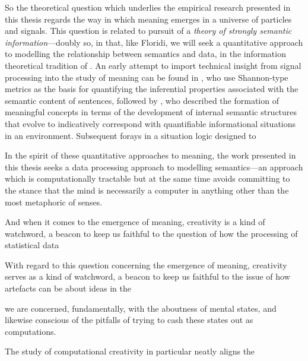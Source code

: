 

So the theoretical question which underlies the empirical research presented in this thesis regards the way in which meaning emerges in a universe of particles and signals.  This question is related to  pursuit of a \emph{theory of strongly semantic information}---doubly so, in that, like Floridi, we will seek a quantitative approach to modelling the relationship between semantics and data, in the information theoretical tradition of \cite{Shannon}.  An early attempt to import technical insight from signal processing into the study of meaning can be found in , who use Shannon-type metrics as the basis for quantifying the inferential properties associated with the semantic content of sentences, followed by \cite{Dretske}, who described the formation of meaningful concepts in terms of the development of internal semantic structures that evolve to indicatively correspond with quantifiable informational situations in an environment.  Subsequent forays in a situation logic designed to 

\cite{BarwiseEA}

In the spirit of these quantitative approaches to meaning, the work presented in this thesis seeks a data processing approach to modelling semantics---an approach which is computationally tractable but at the same time avoids committing to the stance that the mind is necessarily a computer in anything other than the most metaphoric of senses.

And when it comes to the emergence of meaning, creativity is a kind of watchword, a beacon to keep us faithful to the question of how the processing of statistical data 

With regard to this question concerning the emergence of meaning, creativity serves as a kind of watchword, a beacon to keep us faithful to the issue of how artefacts can be about ideas in the 

we are concerned, fundamentally, with the aboutness of mental states, and likewise conscious of the pitfalls of trying to cash these states out as computations.

The study of computational creativity in particular neatly aligns the 

